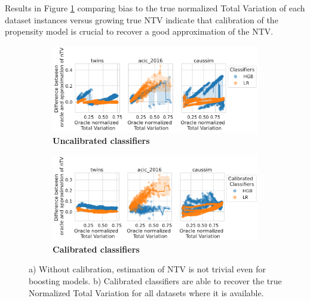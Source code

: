 \documentclass[french,12pt,twoside,a4paper]{book}
\begin{document}
\begin{appendices}
  Results in Figure \ref{apd:overlap:ntv_approximation} comparing bias to the true
  normalized Total Variation of each dataset instances versus growing true NTV
  indicate that calibration of the propensity model is crucial to recover a good
  approximation of the NTV.




  \begin{figure}
    \begin{subfigure}[b]{\textwidth}
      \centering
      \caption{\textbf{Uncalibrated classifiers}}
      \includegraphics[width=\linewidth]{img/chapter_5/overlap_measure_diff_oracle_ntv_to_n_tv_calibration=False_vs_oracle_n_tv.pdf}
    \end{subfigure}
    \begin{subfigure}[b]{\textwidth}
      \centering
      \caption{\textbf{Calibrated
          classifiers}}
      \includegraphics[width=\linewidth]{img/chapter_5/overlap_measure_diff_oracle_ntv_to_n_tv_calibration=True_vs_oracle_n_tv.pdf}
    \end{subfigure}
    \caption{a) Without calibration, estimation of NTV is not trivial even for
      boosting models. b) Calibrated classifiers are able to recover the true
      Normalized Total Variation for all datasets where it is
      available.}\label{apd:overlap:ntv_approximation}
  \end{figure}




\end{appendices}
\end{document}
